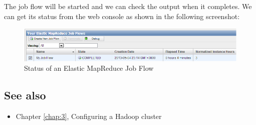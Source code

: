 The job flow will be started and we can check the output when it completes. We can get its status from the web console as shown in the following screenshot:

\begin{figure}[h]
  \centering
  \includegraphics[width=\textwidth]{figs/5163os_08_28.png}
  \caption{Status of an Elastic MapReduce Job Flow}\label{fig:aws.elasticmapred.flow.status}
\end{figure} 

\subsection*{See also}
\begin{itemize}
  \item Chapter \ref{chap:3}, Configuring a Hadoop cluster
\end{itemize}
